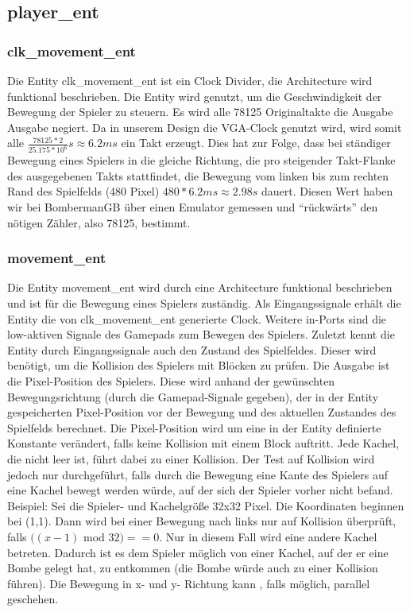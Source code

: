 \documentclass[parskip=full]{scrartcl}
\begin{document}
			\subsection{player\_ent}
				\subsubsection{clk\_movement\_ent}
				Die Entity clk\_movement\_ent ist ein Clock Divider, die Architecture wird funktional beschrieben. Die Entity wird genutzt, um die Geschwindigkeit der Bewegung der Spieler zu steuern. Es wird alle 78125 Originaltakte die Ausgabe Ausgabe negiert. Da in unserem Design die VGA-Clock genutzt wird, wird somit alle $\frac{78125 * 2}{25.175 * 10^6}s \approx 6.2ms$ ein Takt erzeugt. Dies hat zur Folge, dass bei ständiger Bewegung eines Spielers in die gleiche Richtung, die pro steigender Takt-Flanke des ausgegebenen Takts stattfindet, die Bewegung vom linken bis zum rechten Rand des Spielfelds (480 Pixel) $480 * 6.2 ms \approx 2.98 s$ dauert. Diesen Wert haben wir bei BombermanGB über einen Emulator gemessen und \enquote{rückwärts} den nötigen Zähler, also 78125, bestimmt.
				\subsubsection{movement\_ent}
					Die Entity movement\_ent wird durch eine Architecture funktional beschrieben und ist für die Bewegung eines Spielers zuständig. Als Eingangssignale erhält die Entity die von clk\_movement\_ent generierte Clock. Weitere in-Ports sind die low-aktiven Signale des Gamepads zum Bewegen des Spielers. Zuletzt kennt die Entity durch Eingangssignale auch den Zustand des Spielfeldes. Dieser wird benötigt, um die Kollision des Spielers mit Blöcken zu prüfen.
					Die Ausgabe ist die Pixel-Position des Spielers.
					Diese wird anhand der gewünschten Bewegungsrichtung (durch die Gamepad-Signale gegeben), der in der Entity gespeicherten Pixel-Position vor der Bewegung und des aktuellen Zustandes des Spielfelds berechnet. Die Pixel-Position wird um eine in der Entity definierte Konstante verändert, falls keine Kollision mit einem Block auftritt. Jede Kachel, die nicht leer ist, führt dabei zu einer Kollision.
					Der Test auf Kollision wird jedoch nur durchgeführt, falls durch die Bewegung eine Kante des Spielers auf eine Kachel bewegt werden würde, auf der sich der Spieler vorher nicht befand. \newline
					Beispiel: Sei die Spieler- und Kachelgröße 32x32 Pixel. Die Koordinaten beginnen bei (1,1). Dann wird bei einer Bewegung nach links nur auf Kollision überprüft, falls $((x-1)$ mod $32) == 0$. Nur in diesem Fall wird eine andere Kachel betreten.\newline
					Dadurch ist es dem Spieler möglich von einer Kachel, auf der er eine Bombe gelegt hat, zu entkommen (die Bombe würde auch zu einer Kollision führen).
					Die Bewegung in x- und y- Richtung kann , falls möglich, parallel geschehen.
\end{document}
